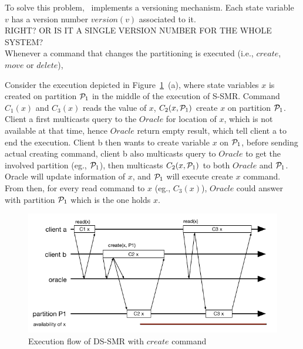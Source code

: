 
To solve this problem, \dssmr\ implements a versioning mechanism.
Each state variable $v$ has a version number $version(v)$ associated to it.
\\
RIGHT? OR IS IT A SINGLE VERSION NUMBER FOR THE WHOLE SYSTEM?
\\
Whenever a command that changes the partitioning is executed (i.e., $create$, $move$ or $delete$), 

Consider the execution depicted in Figure~\ref{fig:read}~(a), where state variables $x$ is created on partition $\mathcal{P}_1$ in the middle of the execution of S-SMR. Command $C_1(x)$ and $C_3(x)$ reads the value of $x$, $C_2(x,\mathcal{P}_1)$ create $x$ on partition $\mathcal{P}_1$. Client a first multicasts query to the $Oracle$ for location of $x$, which is not available at that time, hence $Oracle$ return empty result, which tell client a to end the execution. Client b then wants to create variable $x$ on $\mathcal{P}_1$, before sending actual creating command, client b also multicasts query to $Oracle$ to get the involved partition (eg., $\mathcal{P}_1$), then multicasts $C_2(x,\mathcal{P}_1)$ to both $Oracle$ and $\mathcal{P}_1$. Oracle will update information of $x$, and $\mathcal{P}_1$ will execute create $x$ command. From then, for every read command to $x$ (eg., $C_3(x)$), $Oracle$ could answer with partition $\mathcal{P}_1$ which is the one holds $x$.

\begin{figure}
\begin{minipage}[b]{1.0\linewidth} %
\centering
      \includegraphics[width=0.6\linewidth]{figures/read_simple}
\end{minipage}
\centering
	\caption{Execution flow of DS-SMR with $create$ command}
\label{fig:read}
\end{figure}

